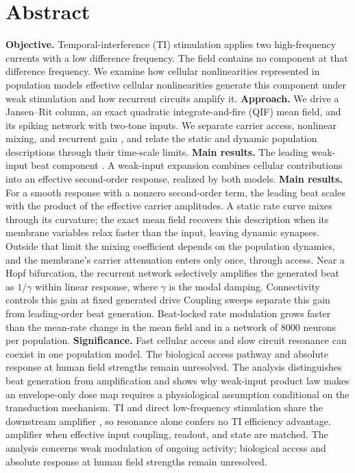 \documentclass[11pt,a4paper]{article}
\newif\ifjne
\providecommand{\DIFaddtex}[1]{{\protect\color{blue} \sf #1}} %
\providecommand{\DIFdeltex}[1]{{\protect\color{red} \scriptsize #1}} %
\providecommand{\DIFaddbegin}{} %
\providecommand{\DIFaddend}{} %
\providecommand{\DIFdelbegin}{} %
\providecommand{\DIFdelend}{} %
\providecommand{\DIFadd}[1]{\texorpdfstring{\DIFaddtex{#1}}{#1}} %
\providecommand{\DIFdel}[1]{\texorpdfstring{\DIFdeltex{#1}}{}} %
\begin{document}
\section*{Abstract}
\ifjne
\noindent
\textbf{Objective.} Temporal-interference (TI) stimulation applies two high-frequency
currents with a low difference frequency. The field contains no component at that
difference frequency. We examine how \DIFdelbegin \DIFdel{cellular nonlinearities represented in population
models }\DIFdelend \DIFaddbegin \DIFadd{effective cellular nonlinearities }\DIFaddend generate this
component \DIFaddbegin \DIFadd{under weak stimulation }\DIFaddend and how recurrent circuits amplify it.
\textbf{Approach.} We drive a Jansen--Rit column, an exact quadratic integrate-and-fire
(QIF) mean field, and its spiking network with two-tone inputs. We separate carrier
access, nonlinear mixing, and recurrent gain\DIFdelbegin \DIFdel{, and relate the static and dynamic
population descriptions through their time-scale limits.
\textbf{Main results.} The leading weak-input beat component }\DIFdelend \DIFaddbegin \DIFadd{. A weak-input expansion combines cellular
contributions into an effective second-order response, realized by both models.
\textbf{Main results.} For a smooth response with a nonzero second-order term, the
leading beat }\DIFaddend scales with the product of the effective carrier amplitudes.
A static rate curve mixes through its curvature;
the exact mean field recovers this description when its membrane variables relax faster
than the input, leaving dynamic synapses. Outside that limit the mixing coefficient
depends on the population dynamics, and the membrane's carrier attenuation enters
only once, through access. Near a Hopf
bifurcation, the recurrent network selectively amplifies the generated beat as
$1/\gamma$ \DIFaddbegin \DIFadd{within linear response}\DIFaddend , where $\gamma$ is the modal damping. \DIFdelbegin \DIFdel{Connectivity controls this gain at
fixed generated drive}\DIFdelend \DIFaddbegin \DIFadd{Coupling sweeps
separate this gain from leading-order beat generation}\DIFaddend . Beat-locked rate modulation
grows faster than the mean-rate change
in the mean field and in a network of $8000$ neurons per population.
\textbf{Significance.} Fast cellular access and slow circuit resonance can coexist in
one population model. The \DIFdelbegin \DIFdel{biological access pathway and absolute response at human
field strengths remain unresolved. The analysis distinguishes beat generation from
amplification and shows why }\DIFdelend \DIFaddbegin \DIFadd{weak-input product law makes }\DIFaddend an envelope-only dose map
\DIFdelbegin \DIFdel{requires a physiological
assumption}\DIFdelend \DIFaddbegin \DIFadd{conditional on the transduction mechanism}\DIFaddend . TI and direct low-frequency stimulation
share the \DIFdelbegin \DIFdel{downstream amplifier ,
so resonance alone confers no TI efficiency advantage.
}\DIFdelend \DIFaddbegin \DIFadd{amplifier when effective input coupling, readout, and state are matched.
The analysis concerns weak modulation of ongoing activity; biological access and
absolute response at human field strengths remain unresolved.
}\DIFaddend
\end{document}
